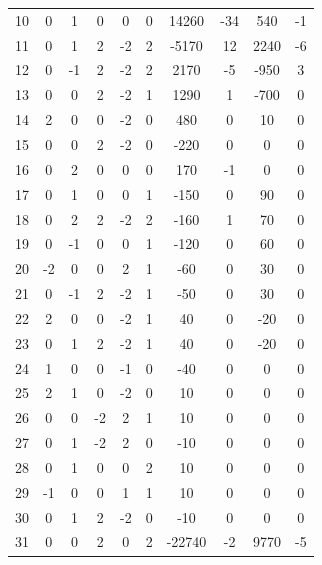 \begin{table}[!htb]
{\begin{tabular}{cccccccccc}
		10    & 0     & 1     & 0     & 0     & 0     & 14260 & -34   & 540   & -1 \\
		11    & 0     & 1     & 2     & -2    & 2     & -5170 & 12    & 2240  & -6 \\
		12    & 0     & -1    & 2     & -2    & 2     & 2170  & -5    & -950  & 3 \\
		13    & 0     & 0     & 2     & -2    & 1     & 1290  & 1     & -700  & 0 \\
		14    & 2     & 0     & 0     & -2    & 0     & 480   & 0     & 10    & 0 \\
		15    & 0     & 0     & 2     & -2    & 0     & -220  & 0     & 0     & 0 \\
		16    & 0     & 2     & 0     & 0     & 0     & 170   & -1    & 0     & 0 \\
		17    & 0     & 1     & 0     & 0     & 1     & -150  & 0     & 90    & 0 \\
		18    & 0     & 2     & 2     & -2    & 2     & -160  & 1     & 70    & 0 \\
		19    & 0     & -1    & 0     & 0     & 1     & -120  & 0     & 60    & 0 \\
		20    & -2    & 0     & 0     & 2     & 1     & -60   & 0     & 30    & 0 \\
		21    & 0     & -1    & 2     & -2    & 1     & -50   & 0     & 30    & 0 \\
		22    & 2     & 0     & 0     & -2    & 1     & 40    & 0     & -20   & 0 \\
		23    & 0     & 1     & 2     & -2    & 1     & 40    & 0     & -20   & 0 \\
		24    & 1     & 0     & 0     & -1    & 0     & -40   & 0     & 0     & 0 \\
		25    & 2     & 1     & 0     & -2    & 0     & 10    & 0     & 0     & 0 \\
		26    & 0     & 0     & -2    & 2     & 1     & 10    & 0     & 0     & 0 \\
		27    & 0     & 1     & -2    & 2     & 0     & -10   & 0     & 0     & 0 \\
		28    & 0     & 1     & 0     & 0     & 2     & 10    & 0     & 0     & 0 \\
		29    & -1    & 0     & 0     & 1     & 1     & 10    & 0     & 0     & 0 \\
		30    & 0     & 1     & 2     & -2    & 0     & -10   & 0     & 0     & 0 \\
		31    & 0     & 0     & 2     & 0     & 2     & -22740 & -2    & 9770  & -5 \\

\end{tabular}}
\end{table}
